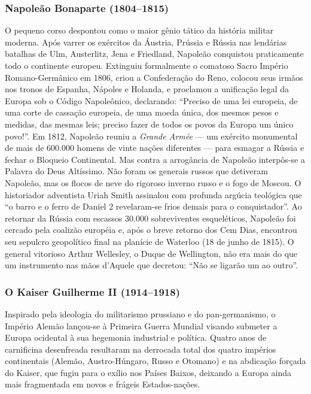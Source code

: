\documentclass[11pt,a4paper,openany]{book}
\begin{document}
\subsubsection*{Napoleão Bonaparte (1804–1815)}
O pequeno corso despontou como o maior gênio tático da história militar moderna. Após varrer os exércitos da Áustria, Prússia e Rússia nas lendárias batalhas de Ulm, Austerlitz, Jena e Friedland, Napoleão conquistou praticamente todo o continente europeu. Extinguiu formalmente o comatoso Sacro Império Romano-Germânico em 1806, criou a Confederação do Reno, colocou seus irmãos nos tronos de Espanha, Nápoles e Holanda, e proclamou a unificação legal da Europa sob o Código Napoleônico, declarando: ``Preciso de uma lei europeia, de uma corte de cassação europeia, de uma moeda única, dos mesmos pesos e medidas, das mesmas leis; preciso fazer de todos os povos da Europa um único povo!''.
Em 1812, Napoleão reuniu a \textit{Grande Armée} — um exército monumental de mais de 600.000 homens de vinte nações diferentes — para esmagar a Rússia e fechar o Bloqueio Continental. Mas contra a arrogância de Napoleão interpôs-se a Palavra do Deus Altíssimo. Não foram os generais russos que detiveram Napoleão, mas os flocos de neve do rigoroso inverno russo e o fogo de Moscou. O historiador adventista Uriah Smith assinalou com profunda argúcia teológica que ``o barro e o ferro de Daniel 2 revelaram-se frios demais para o conquistador''. Ao retornar da Rússia com escassos 30.000 sobreviventes esqueléticos, Napoleão foi cercado pela coalizão européia e, após o breve retorno dos Cem Dias, encontrou seu sepulcro geopolítico final na planície de Waterloo (18 de junho de 1815). O general vitorioso Arthur Wellesley, o Duque de Wellington, não era mais do que um instrumento nas mãos d'Aquele que decretou: ``Não se ligarão um ao outro''.


\subsubsection*{O Kaiser Guilherme II (1914–1918)}
Inspirado pela ideologia do militarismo prussiano e do pan-germanismo, o Império Alemão lançou-se à Primeira Guerra Mundial visando submeter a Europa ocidental à sua hegemonia industrial e política. Quatro anos de carnificina desenfreada resultaram na derrocada total dos quatro impérios continentais (Alemão, Austro-Húngaro, Russo e Otomano) e na abdicação forçada do Kaiser, que fugiu para o exílio nos Países Baixos, deixando a Europa ainda mais fragmentada em novos e frágeis Estados-nações.
\end{document}
